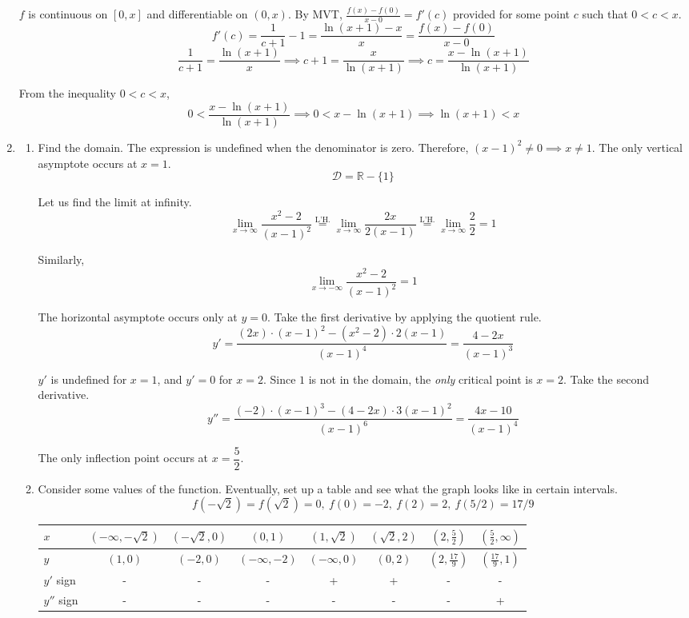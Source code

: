 \documentclass[a4paper, 12pt]{article}
\begin{document}
\begin{enumerate}[leftmargin=*,label=\textbf{\arabic*.}]
\vspace{-0.5em}
$f$ is continuous on $[0,x]$ and differentiable on $(0,x)$. By MVT, $\frac{f(x)-f(0)}{x-0}=f'(c)$ provided for some point $c$ such that $0<c<x$.
\[f'(c)=\frac1{c+1}-1=\frac{\ln(x+1) - x}x=\frac{f(x)-f(0)}{x-0}\]
\[\frac1{c+1}=\frac{\ln(x+1) }x\implies c+1 = \frac x{\ln(x+1)}\implies c=\frac{x-\ln(x+1)}{\ln(x+1)}\]

From the inequality $0<c<x$,
\[0<\frac{x-\ln(x+1)}{\ln(x+1)}\implies 0<x-\ln(x+1)\implies\boxed{\ln(x+1)<x}\]

\item
\begin{enumerate}[leftmargin=*,label=\textbf{\alph*.}]
\item Find the domain. The expression is undefined when the denominator is zero. Therefore, $(x-1)^2\neq0\implies x\neq1$. The only vertical asymptote occurs at $x=1$.
\[\mathcal{D}=\mathbb{R}-\{1\}\]

Let us find the limit at infinity.
\[\lim_{x\to \infty}\frac{x^2-2}{(x-1)^2} \overset{\text{L'H.}}{=} \lim_{x\to \infty} \frac{2x}{2(x-1)} \overset{\text{L'H.}}{=} \lim_{x\to \infty} \frac{2}{2}=1\]

Similarly,
\[\lim_{x\to -\infty}\frac{x^2-2}{(x-1)^2}=1\]

The horizontal asymptote occurs only at $y=0$. Take the first derivative by applying the quotient rule.
\[y'=\frac{(2x)\cdot(x-1)^2-(x^2-2)\cdot 2(x-1)}{(x-1)^4}=\frac{4-2x}{(x-1)^3}\]

$y'$ is undefined for $x=1$, and $y'=0$ for $x=2$. Since $1$ is not in the domain, the \textit{only} critical point is $x = 2$. Take the second derivative.
\[y''=\frac{(-2)\cdot(x-1)^3-(4-2x)\cdot3(x-1)^2}{(x-1)^6}=\frac{4x-10}{(x-1)^4}\]

The only inflection point occurs at $x=\dfrac52$.

\item Consider some values of the function. Eventually, set up a table and see what the graph looks like in certain intervals.
\[f\left(-\sqrt2\right)=f\left(\sqrt2\right)=0,\:f(0)=-2,\:f(2)=2,\:f(5/2)=17/9\]

\begin{center}
    \begin{tabular}{ |p{0.7cm}| c c c c c c c| } 
    \hline
        $x$ & $(-\infty, -\sqrt2)$ & $(-\sqrt2, 0)$&$(0, 1)$ & $(1,\sqrt2)$ & $(\sqrt2, 2)$ & $(2, \frac52)$ & $(\frac52, \infty)$  \\
        \hline
        $y$ & $(1, 0)$ &$(-2,0)$ & $(-\infty, -2)$& $(-\infty, 0)$& $(0, 2)$& $(2, \frac{17}9)$& $(\frac{17}9,1)$\\
        \hline
        $y'$ sign &-&-&-&+&+&-&- \\
        \hline
        $y''$ sign &-&-&-&-&-&-&+ \\
        \hline
    \end{tabular}
\end{center}


\end{enumerate}
\end{enumerate}
\end{document}
